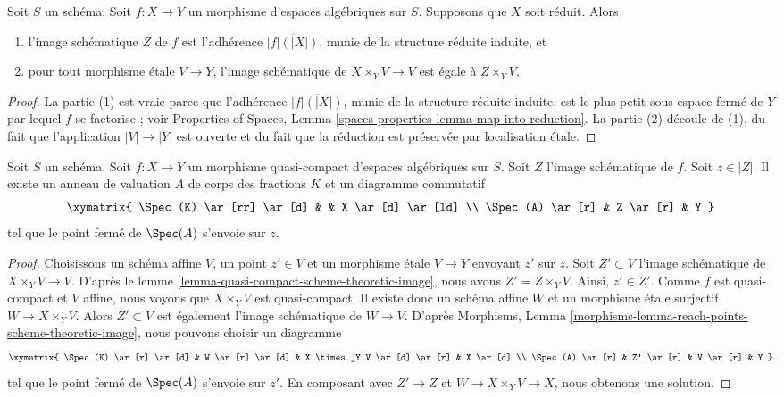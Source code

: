 \begin{lemma}
\label{lemma-scheme-theoretic-image-reduced}
Soit $S$ un schéma. Soit $f : X \to Y$ un morphisme d'espaces algébriques
sur $S$. Supposons que $X$ soit réduit. Alors
\begin{enumerate}
\item l'image schématique $Z$ de $f$ est l'adhérence $\overline{|f|(|X|)}$, munie de la
structure réduite induite, et
\item pour tout morphisme étale $V \to Y$, l'image schématique de
$X \times_Y V \to V$ est égale à $Z \times_Y V$.
\end{enumerate}
\end{lemma}

\begin{proof}
La partie (1) est vraie parce que l'adhérence $\overline{|f|(|X|)}$, munie de la
structure réduite induite, est le plus petit sous-espace fermé
de $Y$ par lequel $f$ se factorise ; voir
Properties of Spaces, Lemma \ref{spaces-properties-lemma-map-into-reduction}.
La partie (2) découle de (1), du fait que l'application $|V| \to |Y|$ est ouverte et du
fait que la réduction est préservée par localisation étale.
\end{proof}

\begin{lemma}
\label{lemma-reach-points-scheme-theoretic-image}
Soit $S$ un schéma.
Soit $f : X \to Y$ un morphisme quasi-compact d'espaces algébriques sur $S$.
Soit $Z$ l'image schématique de $f$.
Soit $z \in |Z|$. Il existe un anneau de valuation $A$ de
corps des fractions $K$ et un diagramme commutatif
$$
\xymatrix{
\Spec(K) \ar[rr] \ar[d] & & X \ar[d] \ar[ld] \\
\Spec(A) \ar[r] & Z \ar[r] & Y
}
$$
tel que le point fermé de $\Spec(A)$ s'envoie sur $z$.
\end{lemma}

\begin{proof}
Choisissons un schéma affine $V$, un point $z' \in V$
et un morphisme étale $V \to Y$ envoyant $z'$ sur $z$.
Soit $Z' \subset V$ l'image schématique de $X \times_Y V \to V$.
D'après le lemme \ref{lemma-quasi-compact-scheme-theoretic-image}, nous avons
$Z' = Z \times_Y V$. Ainsi, $z' \in Z'$.
Comme $f$ est quasi-compact et $V$ affine, nous voyons que
$X \times_Y V$ est quasi-compact. Il existe donc
un schéma affine $W$ et un morphisme étale surjectif
$W \to X \times_Y V$. Alors $Z' \subset V$ est également
l'image schématique de $W \to V$.
D'après Morphisms, Lemma \ref{morphisms-lemma-reach-points-scheme-theoretic-image},
nous pouvons choisir un diagramme
$$
\xymatrix{
\Spec(K) \ar[r] \ar[d] &
W \ar[r] \ar[d] &
X \times_Y V \ar[d] \ar[r] &
X \ar[d] \\
\Spec(A) \ar[r] &
Z' \ar[r] &
V \ar[r] &
Y
}
$$
tel que le point fermé de $\Spec(A)$ s'envoie sur $z'$.
En composant avec $Z' \to Z$ et $W \to X \times_Y V \to X$,
nous obtenons une solution.
\end{proof}

